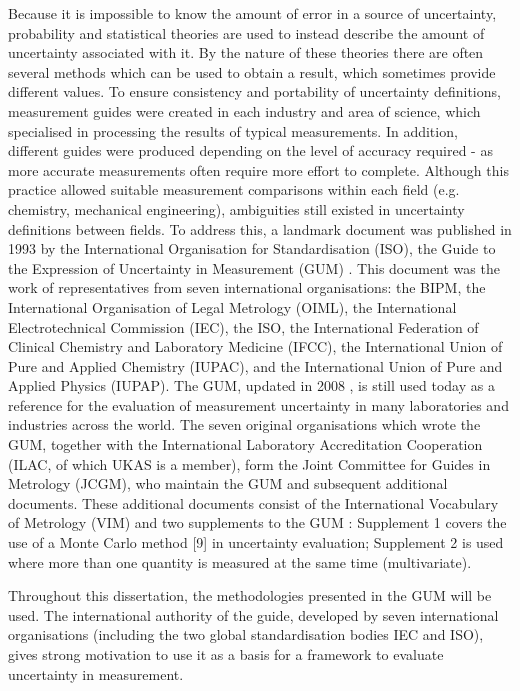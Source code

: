 \documentclass[../thesis/thesis.tex]{subfiles}
\begin{document}
\begin{refsection}
Because it is impossible to know the amount of error in a source of uncertainty, probability and statistical theories are used to instead describe the amount of uncertainty associated with it. By the nature of these theories there are often several methods which can be used to obtain a result, which sometimes provide different values. To ensure consistency and portability of uncertainty definitions, measurement guides were created in each industry and area of science, which specialised in processing the results of typical measurements. In addition, different guides were produced depending on the level of accuracy required - as more accurate measurements often require more effort to complete. Although this practice allowed suitable measurement comparisons within each field (e.g. chemistry, mechanical engineering), ambiguities still existed in uncertainty definitions between fields. To address this, a landmark document was published in 1993 by the International Organisation for Standardisation (ISO), the Guide to the Expression of Uncertainty in Measurement (GUM) \cite{GUM_1993}. This document was the work of representatives from seven international organisations: the BIPM, the International Organisation of Legal Metrology (OIML), the International Electrotechnical Commission (IEC), the ISO, the International Federation of Clinical Chemistry and Laboratory Medicine (IFCC), the International Union of Pure and Applied Chemistry (IUPAC), and the International Union of Pure and Applied Physics (IUPAP). The GUM, updated in 2008 \cite{GUM_2008}, is still used today as a reference for the evaluation of measurement uncertainty in many laboratories and industries across the world. The seven original organisations which wrote the GUM, together with the International Laboratory Accreditation Cooperation (ILAC, of which UKAS is a member), form the Joint Committee for Guides in Metrology (JCGM), who maintain the GUM and subsequent additional documents. These additional documents consist of the International Vocabulary of Metrology (VIM) \cite{VIM} and two supplements to the GUM \cite{GUM_S1,GUM_S2}: Supplement 1 covers the use of a Monte Carlo method [9] in uncertainty evaluation; Supplement 2 is used where more than one quantity is measured at the same time (multivariate).

Throughout this dissertation, the methodologies presented in the GUM will be used. The international authority of the guide, developed by seven international organisations (including the two global standardisation bodies IEC and ISO), gives strong motivation to use it as a basis for a framework to evaluate uncertainty in measurement.


\end{refsection}
\end{document}
